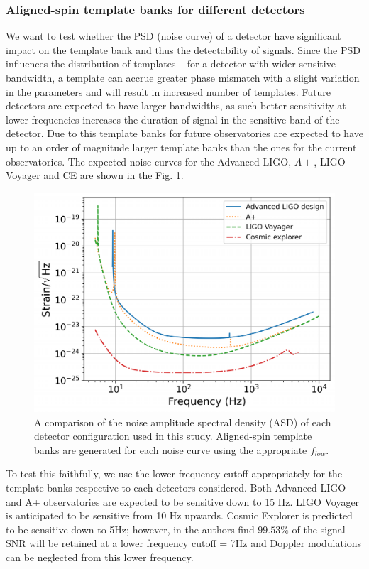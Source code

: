 \subsubsection{Aligned-spin template banks for different detectors}
We want to test whether the PSD (noise curve) of a detector have significant impact on the template bank and thus the detectability of signals. Since the PSD influences the distribution of templates -- for a detector with wider sensitive bandwidth, a template can accrue greater phase mismatch with a slight variation in the parameters and will result in increased number of templates. Future detectors are expected to have larger bandwidths, as such better sensitivity at lower frequencies increases the duration of signal in the sensitive band of the detector. Due to this template banks for future observatories are expected to have up to an order of magnitude larger template banks than the ones for the current observatories. The expected noise curves for the Advanced LIGO, $A+$, LIGO Voyager and CE are shown in the Fig. \ref{fig:PSDs}.  

\begin{figure}
    \centering
    \includegraphics[width=\linewidth]{figures/HM_and_precession/PSDs.pdf}
    \caption{A comparison of the noise amplitude spectral density (ASD) of each detector configuration used in this study. Aligned-spin template banks are generated for each noise curve using the appropriate $f_{low}$. } 
    \label{fig:PSDs}
\end{figure}

To test this faithfully, we use the lower frequency cutoff appropriately for the template banks respective to each detectors considered. Both Advanced LIGO and A+ observatories are expected to be sensitive down to 15 Hz. LIGO Voyager is anticipated to be sensitive from 10 Hz upwards. Cosmic Explorer is predicted to be sensitive down to 5Hz; however, in \cite{Lenon:2021zac} the authors find $99.53\%$ of the signal SNR will be retained at a lower frequency cutoff = 7Hz and Doppler modulations can be neglected from this lower frequency.

